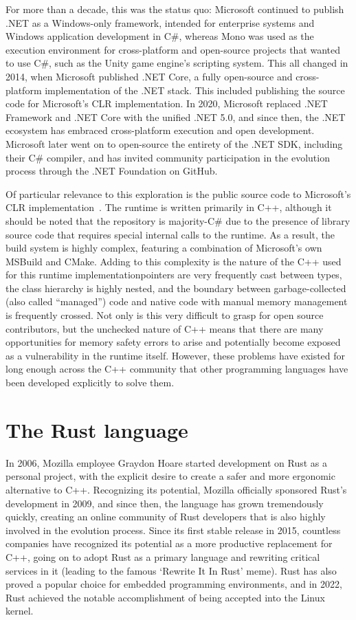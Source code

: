 For more than a decade, this was the status quo: Microsoft continued to publish .NET as a Windows-only framework, intended for enterprise systems and Windows
application development in C\#, whereas Mono was used as the execution environment for cross-platform and open-source projects that wanted to use C\#,
such as the Unity game engine's scripting system. %
This all changed in 2014, when Microsoft published .NET Core, a fully open-source and cross-platform implementation of the .NET stack.
This included publishing the source code for Microsoft's CLR implementation.
In 2020, Microsoft replaced .NET Framework and .NET Core with the unified .NET 5.0, and since then, the .NET ecosystem has embraced
cross-platform execution and open development.
Microsoft later went on to open-source the entirety of the .NET SDK, including their C\# compiler,
and has invited community participation in the evolution process through the .NET Foundation on GitHub.

Of particular relevance to this exploration is the public source code to Microsoft's CLR implementation~\cite{runtime}.
The runtime is written primarily in C++, although it should be noted that the repository is majority-C\# due to the presence of
library source code that requires special internal calls to the runtime.
As a result, the build system is highly complex, featuring a combination of Microsoft's own MSBuild and CMake.
Adding to this complexity is the nature of the C++ used for this runtime implementation\emdash{}pointers are very frequently cast between types,
the class hierarchy is highly nested, and the boundary between garbage-collected (also called ``managed'') code and native code with
manual memory management is frequently crossed.
Not only is this very difficult to grasp for open source contributors, but the unchecked nature of C++ means that there are many
opportunities for memory safety errors to arise and potentially become exposed as a vulnerability in the runtime itself.
However, these problems have existed for long enough across the C++ community that other programming languages have been developed
explicitly to solve them.

\section{The Rust language}
In 2006, Mozilla employee Graydon Hoare started development on Rust as a personal project,
with the explicit desire to create a safer and more ergonomic alternative to C++.
Recognizing its potential, Mozilla officially sponsored Rust's development in 2009, and since then, the language has grown tremendously quickly,
creating an online community of Rust developers that is also highly involved in the evolution process.
Since its first stable release in 2015, countless companies have recognized its potential as a more productive replacement for C++,
going on to adopt Rust as a primary language and rewriting critical services in it (leading to the famous `Rewrite It In Rust' meme).
Rust has also proved a popular choice for embedded programming environments, and in 2022,
Rust achieved the notable accomplishment of being accepted into the Linux kernel.


